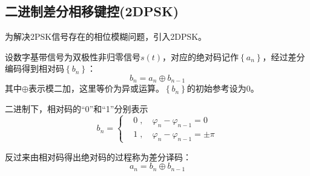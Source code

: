         \subsection{二进制差分相移键控(2DPSK)}
        为解决2PSK信号存在的相位模糊问题，引入2DPSK。

        设数字基带信号为双极性非归零信号$s(t)$，对应的绝对码记作$\left\{a_n\right\}$，经过差分编码得到相对码$\left\{b_n\right\}$：
        \begin{equation}
            b_n=a_n\oplus b_{n-1}
        \end{equation}
        其中$\oplus$表示模二加，这里等价为异或运算。$\left\{b_n\right\}$的初始参考设为$0$。

        二进制下，相对码的“0”和“1”分别表示
        \begin{equation}
            b_n=
            \left\{\begin{aligned}
                &0\;,\quad \varphi_n-\varphi_{n-1}=0\\
                &1\;,\quad \varphi_n-\varphi_{n-1}=\pm \pi
            \end{aligned}\right.
        \end{equation}

        反过来由相对码得出绝对码的过程称为差分译码：
        \begin{equation}
            a_n=b_n\oplus b_{n-1}
        \end{equation}

